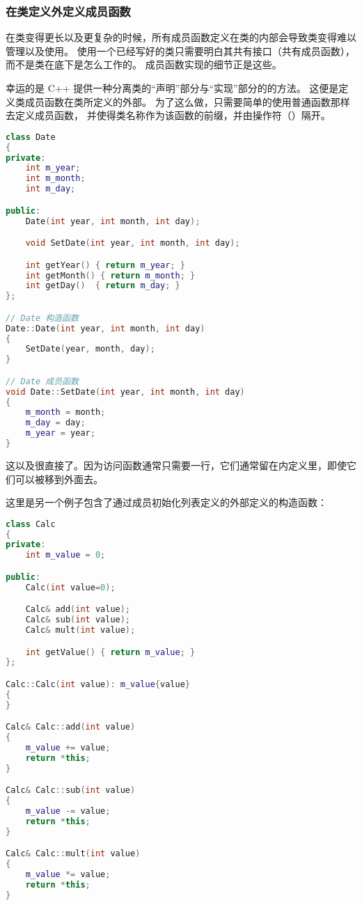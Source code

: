 \documentclass[../../LearnCpp.tex]{subfiles}
\begin{document}

\subsubsection*{在类定义外定义成员函数}

在类变得更长以及更复杂的时候，所有成员函数定义在类的内部会导致类变得难以管理以及使用。
使用一个已经写好的类只需要明白其共有接口（共有成员函数），而不是类在底下是怎么工作的。
成员函数实现的细节正是这些。

幸运的是 C++ 提供一种分离类的“声明”部分与“实现”部分的的方法。
这便是定义类成员函数在类所定义的外部。
为了这么做，只需要简单的使用普通函数那样去定义成员函数，
并使得类名称作为该函数的前缀，并由操作符（\acode{::}）隔开。

\begin{lstlisting}[language=C++]
class Date
{
private:
    int m_year;
    int m_month;
    int m_day;

public:
    Date(int year, int month, int day);

    void SetDate(int year, int month, int day);

    int getYear() { return m_year; }
    int getMonth() { return m_month; }
    int getDay()  { return m_day; }
};

// Date 构造函数
Date::Date(int year, int month, int day)
{
    SetDate(year, month, day);
}

// Date 成员函数
void Date::SetDate(int year, int month, int day)
{
    m_month = month;
    m_day = day;
    m_year = year;
}
\end{lstlisting}

这以及很直接了。因为访问函数通常只需要一行，它们通常留在内定义里，即使它们可以被移到外面去。

这里是另一个例子包含了通过成员初始化列表定义的外部定义的构造函数：

\begin{lstlisting}[language=C++]
class Calc
{
private:
    int m_value = 0;

public:
    Calc(int value=0);

    Calc& add(int value);
    Calc& sub(int value);
    Calc& mult(int value);

    int getValue() { return m_value; }
};

Calc::Calc(int value): m_value{value}
{
}

Calc& Calc::add(int value)
{
    m_value += value;
    return *this;
}

Calc& Calc::sub(int value)
{
    m_value -= value;
    return *this;
}

Calc& Calc::mult(int value)
{
    m_value *= value;
    return *this;
}
\end{lstlisting}
\end{document}

